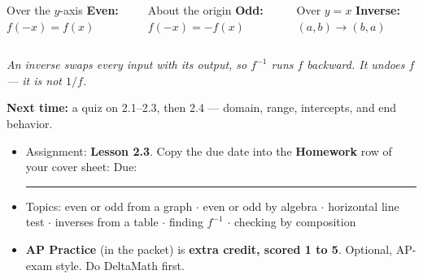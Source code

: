 \documentclass[aspectratio=169, 11pt]{beamer}
\begin{document}
\begin{frame}[t, plain]

  \begin{columns}[T]
      \begin{block}{Over the \(y\)-axis}
        \textbf{Even:} \(f(-x) = f(x)\)
      \end{block}
      \begin{block}{About the origin}
        \textbf{Odd:} \(f(-x) = -f(x)\)
      \end{block}
      \begin{block}{Over \(y = x\)}
        \textbf{Inverse:} \((a, b) \to (b, a)\)
      \end{block}
  \end{columns}

  \bigskip
  \begin{center}
    \large\textit{An inverse swaps every input with its output, so \(f^{-1}\) runs \(f\)
    backward. It undoes \(f\) --- it is not \(1/f\).}
  \end{center}

  \bigskip
  \textbf{Next time:} a quiz on 2.1--2.3, then 2.4 --- domain, range, intercepts, and end
  behavior.
\end{frame}

\begin{frame}[t, plain]

  \begin{itemize}\setlength{\itemsep}{8pt}
    \item Assignment: \textbf{Lesson 2.3}. Copy the due date into the \textbf{Homework} row of
          your cover sheet: \quad Due: \rule{3cm}{0.4pt}
    \item Topics: even or odd from a graph $\cdot$ even or odd by algebra $\cdot$ horizontal
          line test $\cdot$ inverses from a table $\cdot$ finding \(f^{-1}\) $\cdot$ checking
          by composition
    \item \textbf{AP Practice} (in the packet) is \textbf{extra credit, scored 1 to 5}. Optional,
          AP-exam style. Do DeltaMath first.
  \end{itemize}
\end{frame}
\end{document}

